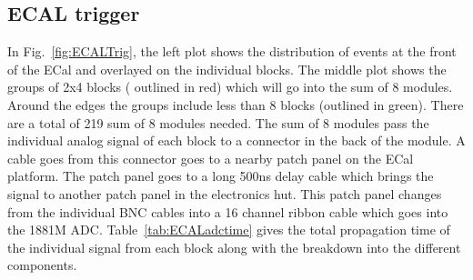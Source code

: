 \documentclass{article}
\begin{document}
\subsection{ECAL trigger}
\label{sec:ecal-trig}
In Fig.~\ref{fig:ECALTrig}, the left plot shows the distribution of events at the front of the ECal
and overlayed on the individual blocks. The middle plot shows the groups of 2x4 blocks ( outlined in red)
which will go into the sum of 8 modules. Around the edges the groups include less than 8 blocks 
(outlined in green). There are a total of 219 sum of 8 modules needed.
The sum of 8 modules pass the individual analog signal of each block to a connector in the
back of the module. A cable goes from this connector goes to a nearby patch panel on the ECal platform. The patch panel goes to a long 500ns delay cable which brings the signal to
another patch panel in the electronics hut. This patch panel changes from the individual BNC cables into a 16 channel ribbon cable which goes into the 1881M ADC. 
Table~\ref{tab:ECALadctime} gives the total propagation time of the individual signal from each block along with the breakdown into the different components.
\end{document}
